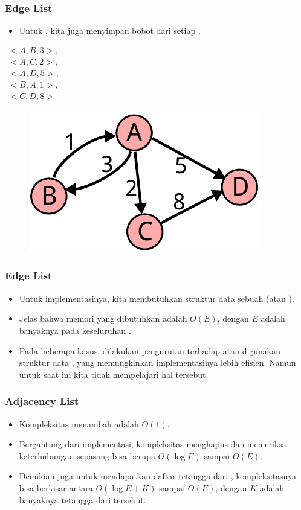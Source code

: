 \begin{frame}
\frametitle{Edge List}
\begin{itemize}
  \item Untuk  \fgraph, kita juga menyimpan bobot dari setiap \fedge.
\end{itemize}
\begin{center}
\begin{multicols}{2}
  $\begin{array}{l}
    <A, B, 3>, \\
    <A, C, 2>, \\
    <A, D, 5>, \\
    <B, A, 1>, \\
    <C, D, 8> 
  \end{array}$
  \break
  \begin{figure}
    \includegraphics[width=4 cm]{asset/weighted-directed.pdf}
  \end{figure}
\end{multicols} 
\end{center}
\end{frame}

\begin{frame}
\frametitle{Edge List}
\begin{itemize}
  \item Untuk implementasinya, kita membutuhkan struktur data sebuah \flist (atau \farray).
  \item Jelas bahwa memori yang dibutuhkan adalah $O(E)$, dengan $E$ adalah banyaknya \fedge pada keseluruhan \fgraph.
  \newline
  \item Pada beberapa kasus, dilakukan pengurutan terhadap \fedgelist atau digunakan struktur data , yang memungkinkan implementasinya lebih efisien.
  Namun untuk saat ini kita tidak mempelajari hal tersebut.
\end{itemize}
\end{frame}

\begin{frame}
\frametitle{Adjacency List}
\begin{itemize}
  \item Kompleksitas menambah \fedge adalah $O(1)$.
  \item Bergantung dari implementasi, kompleksitas menghapus \fedge dan memeriksa keterhubungan sepasang \fnode bisa berupa $O(\log{E})$ sampai $O(E)$.
  \item Demikian juga untuk mendapatkan daftar tetangga dari \fnode, kompleksitasnya bisa berkisar antara $O(\log{E} + K)$ sampai $O(E)$, dengan $K$ adalah banyaknya tetangga dari \fnode tersebut.
\end{itemize}
\end{frame}


